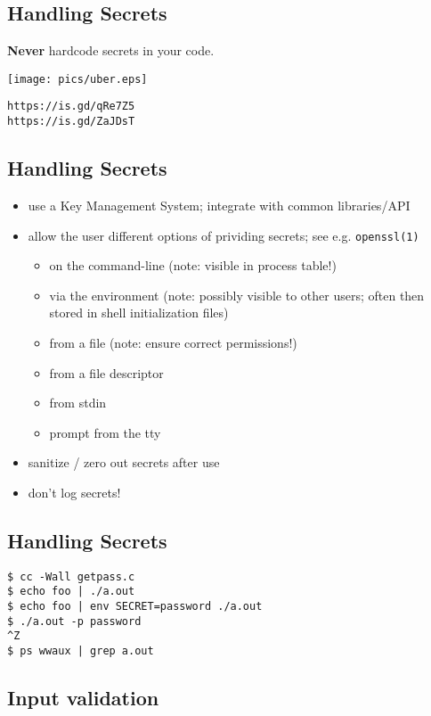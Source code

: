 \documentclass[xga]{xdvislides}
\begin{document}
\subsection{Handling Secrets}
{\bf Never} hardcode secrets in your code. \\

\begin{center}
        \texttt{[image: pics/uber.eps]}
\end{center}

\verb+https://is.gd/qRe7Z5+ \\
\verb+https://is.gd/ZaJDsT+

\subsection{Handling Secrets}
\begin{itemize}
	\item use a Key Management System; integrate
		with common libraries/API
	\item allow the user different options of
		prividing secrets; see e.g. \verb+openssl(1)+
		\begin{itemize}
			\item on the command-line (note:
			visible in process table!)
			\item via the environment (note:
			possibly visible to other users;
			often then stored in shell
			initialization files)
			\item from a file (note: ensure
			correct permissions!)
			\item from a file descriptor
			\item from stdin
			\item prompt from the tty
		\end{itemize}
	\item sanitize / zero out secrets after use
	\item don't log secrets!
\end{itemize}

\subsection{Handling Secrets}
\begin{verbatim}
$ cc -Wall getpass.c
$ echo foo | ./a.out
$ echo foo | env SECRET=password ./a.out
$ ./a.out -p password
^Z
$ ps wwaux | grep a.out
\end{verbatim}

\subsection{Input validation}
\end{document}
